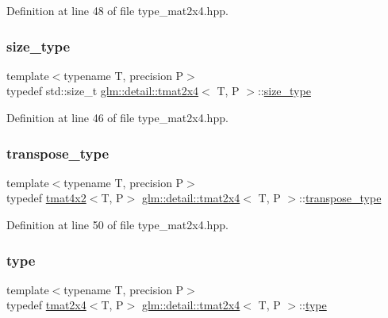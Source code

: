 Definition at line 48 of file type\+\_\+mat2x4.\+hpp.

\mbox{\label{structglm_1_1detail_1_1tmat2x4_a93a0c2fd19243d8fa55a0c45a740794d}} 
\subsubsection{\texorpdfstring{size\+\_\+type}{size\_type}}
{\footnotesize\ttfamily template$<$typename T, precision P$>$ \\
typedef std\+::size\+\_\+t \hyperlink{structglm_1_1detail_1_1tmat2x4}{glm\+::detail\+::tmat2x4}$<$ T, P $>$\+::\hyperlink{structglm_1_1detail_1_1tmat2x4_a93a0c2fd19243d8fa55a0c45a740794d}{size\+\_\+type}}



Definition at line 46 of file type\+\_\+mat2x4.\+hpp.

\mbox{\label{structglm_1_1detail_1_1tmat2x4_ad89bce74852aa9d53de6c2b780e7854f}} 
\subsubsection{\texorpdfstring{transpose\+\_\+type}{transpose\_type}}
{\footnotesize\ttfamily template$<$typename T, precision P$>$ \\
typedef \hyperlink{structglm_1_1detail_1_1tmat4x2}{tmat4x2}$<$T, P$>$ \hyperlink{structglm_1_1detail_1_1tmat2x4}{glm\+::detail\+::tmat2x4}$<$ T, P $>$\+::\hyperlink{structglm_1_1detail_1_1tmat2x4_ad89bce74852aa9d53de6c2b780e7854f}{transpose\+\_\+type}}



Definition at line 50 of file type\+\_\+mat2x4.\+hpp.

\mbox{\label{structglm_1_1detail_1_1tmat2x4_a6e5bd72f58de7f3b40f3e9cf74df9b89}} 
\subsubsection{\texorpdfstring{type}{type}}
{\footnotesize\ttfamily template$<$typename T, precision P$>$ \\
typedef \hyperlink{structglm_1_1detail_1_1tmat2x4}{tmat2x4}$<$T, P$>$ \hyperlink{structglm_1_1detail_1_1tmat2x4}{glm\+::detail\+::tmat2x4}$<$ T, P $>$\+::\hyperlink{structglm_1_1detail_1_1tmat2x4_a6e5bd72f58de7f3b40f3e9cf74df9b89}{type}}



